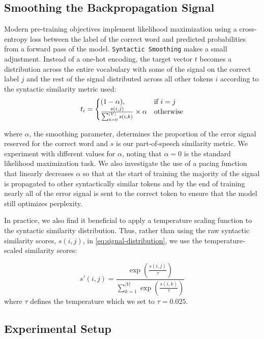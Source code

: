 \subsection{Smoothing the Backpropagation Signal}\label{section:smoothing}

Modern pre-training objectives implement likelihood maximization using a cross-entropy loss between the label of the correct word and predicted probabilities from a forward pass of the model. \texttt{Syntactic Smoothing} makes a small adjustment. Instead of a one-hot encoding, the target vector $t$ becomes a distribution across the entire vocabulary with some of the signal on the correct label $j$ and the rest of the signal distributed across all other tokens $i$ according to the syntactic similarity metric used:
\begin{equation}
\label{eq:signal-distribution}
    t_i=\left\{
  \begin{array}{@{}ll@{}}
    (1-\alpha), & \text{if}\ i=j \\
    \frac{s(i,j)}{\sum_{k=0}^{|V|}{s(i,k)}} \times \alpha & \text{otherwise}
  \end{array}\right.
\end{equation}

\noindent
where $\alpha$, the smoothing parameter, determines the proportion of the error signal reserved for the correct word and $s$ is our part-of-speech similarity metric. We experiment with different values for $\alpha$, noting that $\alpha=0$ is the standard likelihood maximization task. We also investigate the use of a pacing function that linearly decreases $\alpha$ so that at the start of training the majority of the signal is propagated to other syntactically similar tokens and by the end of training nearly all of the error signal is sent to the correct token to ensure that the model still optimizes perplexity. 

In practice, we also find it beneficial to apply a temperature scaling function to the syntactic similarity distribution. Thus, rather than using the raw syntactic similarity scores, $s(i,j)$, in \cref{eq:signal-distribution}, we use the temperature-scaled similarity scores:

$$
s'(i,j) = \frac{\exp\left(\frac{s(i,j)}{\tau}\right)}{\sum_{k=1}^{|V|} \exp\left(\frac{s(i,k)}{\tau}\right)}
$$
where $\tau$ defines the temperature which we set to $\tau=0.025$.

\subsection{Experimental Setup}
\label{subsection:experimental_setup}


